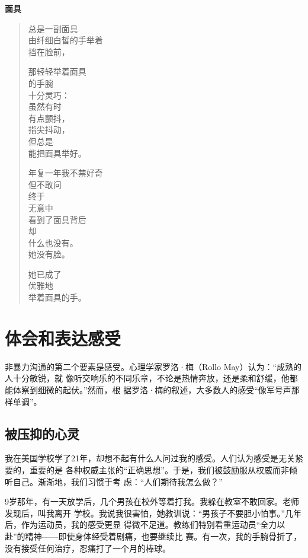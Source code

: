 \documentclass{ctexart}
\newcommand{\person}[1]{%
\nopagebreak{\raggedleft\small ------#1\par}}
\begin{document}
\textbf{面具}

\begin{verse}
	总是一副面具\\
	由纤细白皙的手举着\\
	挡在脸前，

	那轻轻举着面具\\
	的手腕\\
	十分灵巧：\\
	虽然有时\\
	有点颤抖，\\
	指尖抖动，\\
	但总是\\
	能把面具举好。

	年复一年我不禁好奇\\
	但不敢问\\
	终于\\
	无意中\\
	看到了面具背后\\
	却\\
	什么也没有。\\
	她没有脸。

	她已成了\\
	优雅地\\
	举着面具的手。\\
	\person{佚名}
\end{verse}

\section{体会和表达感受}\label{sec:体会和表达感受}

非暴力沟通的第二个要素是感受。心理学家罗洛·梅（Rollo May）认为：``成熟的人十分敏锐，就
像听交响乐的不同乐章，不论是热情奔放，还是柔和舒缓，他都能体察到细微的起伏。''然而，根
据罗洛·梅的叙述，大多数人的感受``像军号声那样单调''。

\subsection{被压抑的心灵}

我在美国学校学了21年，却想不起有什么人问过我的感受。人们认为感受是无关紧要的，重要的是
各种权威主张的``正确思想''。于是，我们被鼓励服从权威而非倾听自己。渐渐地，我们习惯于考
虑：``人们期待我怎么做？''

9岁那年，有一天放学后，几个男孩在校外等着打我。我躲在教室不敢回家。老师发现后，叫我离开
学校。我说我很害怕，她教训说：``男孩子不要胆小怕事。''几年后，作为运动员，我的感受更显
得微不足道。教练们特别看重运动员``全力以赴''的精神------即使身体经受着剧痛，也要继续比
赛。有一次，我的手腕骨折了，没有接受任何治疗，忍痛打了一个月的棒球。
\end{document}
